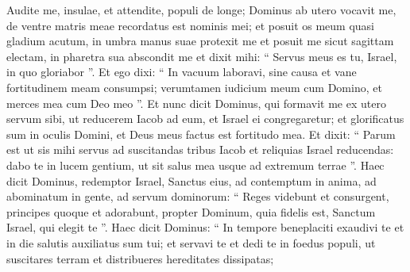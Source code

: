 \begin{biblechapter}
\begin{biblechapter}
\begin{biblechapter}
\begin{biblechapter}
\begin{biblechapter}
\begin{biblechapter}
\begin{biblechapter}
\begin{biblechapter}
\begin{biblechapter}
\begin{biblechapter}
\begin{biblechapter}
\begin{biblechapter}
\begin{biblechapter}
\begin{biblechapter}
\begin{biblechapter}
\begin{biblechapter}
\begin{biblechapter}
\begin{biblechapter}
\begin{biblechapter}
\begin{biblechapter}
\begin{biblechapter}
\begin{biblechapter}
\begin{biblechapter}
\begin{biblechapter}
\begin{biblechapter}
\begin{biblechapter}
\begin{biblechapter}
\begin{biblechapter}
\begin{biblechapter}
\begin{biblechapter}
\begin{biblechapter}
\begin{biblechapter}
\begin{biblechapter}
\begin{biblechapter}
\begin{biblechapter}
\begin{biblechapter}
\begin{biblechapter}
\begin{biblechapter}
\begin{biblechapter}
\begin{biblechapter}
\begin{biblechapter}
\begin{biblechapter}
\begin{biblechapter}
\begin{biblechapter}
\begin{biblechapter}
\begin{biblechapter}
\begin{biblechapter}
\begin{biblechapter}
\begin{biblechapter}
\verse Audite me, insulae, et attendite, populi de longe;
 Dominus ab utero vocavit me,
 de ventre matris meae recordatus est nominis mei;
 \verse et posuit os meum quasi gladium acutum,
 in umbra manus suae protexit me
 et posuit me sicut sagittam electam,
 in pharetra sua abscondit me
 \verse et dixit mihi: “ Servus meus es tu,
 Israel, in quo gloriabor ”.
 \verse Et ego dixi: “ In vacuum laboravi,
 sine causa et vane fortitudinem meam consumpsi;
 verumtamen iudicium meum cum Domino,
 et merces mea cum Deo meo ”.
 \verse Et nunc dicit Dominus,
 qui formavit me ex utero servum sibi,
 ut reducerem Iacob ad eum,
 et Israel ei congregaretur;
 et glorificatus sum in oculis Domini,
 et Deus meus factus est fortitudo mea.
 \verse Et dixit: “ Parum est ut sis mihi servus
 ad suscitandas tribus Iacob
 et reliquias Israel reducendas:
 dabo te in lucem gentium,
 ut sit salus mea usque ad extremum terrae ”.
 \verse Haec dicit Dominus,
 redemptor Israel, Sanctus eius,
 ad contemptum in anima,
 ad abominatum in gente,
 ad servum dominorum:
 “ Reges videbunt et consurgent,
 principes quoque et adorabunt,
 propter Dominum, quia fidelis est,
 Sanctum Israel, qui elegit te ”.
 \verse Haec dicit Dominus:
 “ In tempore beneplaciti exaudivi te
 et in die salutis auxiliatus sum tui;
 et servavi te et dedi te in foedus populi,
 ut suscitares terram
 et distribueres hereditates dissipatas;

\end{biblechapter}
\end{biblechapter}
\end{biblechapter}
\end{biblechapter}
\end{biblechapter}
\end{biblechapter}
\end{biblechapter}
\end{biblechapter}
\end{biblechapter}
\end{biblechapter}
\end{biblechapter}
\end{biblechapter}
\end{biblechapter}
\end{biblechapter}
\end{biblechapter}
\end{biblechapter}
\end{biblechapter}
\end{biblechapter}
\end{biblechapter}
\end{biblechapter}
\end{biblechapter}
\end{biblechapter}
\end{biblechapter}
\end{biblechapter}
\end{biblechapter}
\end{biblechapter}
\end{biblechapter}
\end{biblechapter}
\end{biblechapter}
\end{biblechapter}
\end{biblechapter}
\end{biblechapter}
\end{biblechapter}
\end{biblechapter}
\end{biblechapter}
\end{biblechapter}
\end{biblechapter}
\end{biblechapter}
\end{biblechapter}
\end{biblechapter}
\end{biblechapter}
\end{biblechapter}
\end{biblechapter}
\end{biblechapter}
\end{biblechapter}
\end{biblechapter}
\end{biblechapter}
\end{biblechapter}
\end{biblechapter}
